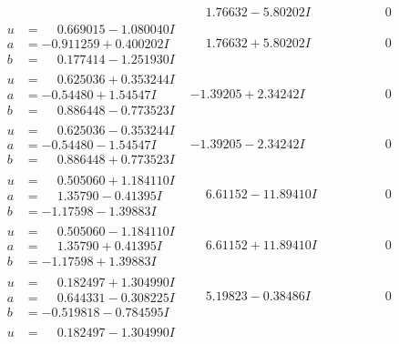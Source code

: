 \documentclass[1p]{elsarticle_modified}
\theoremstyle{definition}
\begin{document}
$$\begin{array}{c|c|c}
 & \phantom{-}1.76632 - 5.80202 I & \phantom{-0.000000 } 0 \\ \hline\begin{aligned}
u &= \phantom{-}0.669015 - 1.080040 I \\
a &= -0.911259 + 0.400202 I \\
b &= \phantom{-}0.177414 - 1.251930 I\end{aligned}
 & \phantom{-}1.76632 + 5.80202 I & \phantom{-0.000000 } 0 \\ \hline\begin{aligned}
u &= \phantom{-}0.625036 + 0.353244 I \\
a &= -0.54480 + 1.54547 I \\
b &= \phantom{-}0.886448 - 0.773523 I\end{aligned}
 & -1.39205 + 2.34242 I & \phantom{-0.000000 } 0 \\ \hline\begin{aligned}
u &= \phantom{-}0.625036 - 0.353244 I \\
a &= -0.54480 - 1.54547 I \\
b &= \phantom{-}0.886448 + 0.773523 I\end{aligned}
 & -1.39205 - 2.34242 I & \phantom{-0.000000 } 0 \\ \hline\begin{aligned}
u &= \phantom{-}0.505060 + 1.184110 I \\
a &= \phantom{-}1.35790 - 0.41395 I \\
b &= -1.17598 - 1.39883 I\end{aligned}
 & \phantom{-}6.61152 - 11.89410 I & \phantom{-0.000000 } 0 \\ \hline\begin{aligned}
u &= \phantom{-}0.505060 - 1.184110 I \\
a &= \phantom{-}1.35790 + 0.41395 I \\
b &= -1.17598 + 1.39883 I\end{aligned}
 & \phantom{-}6.61152 + 11.89410 I & \phantom{-0.000000 } 0 \\ \hline\begin{aligned}
u &= \phantom{-}0.182497 + 1.304990 I \\
a &= \phantom{-}0.644331 - 0.308225 I \\
b &= -0.519818 - 0.784595 I\end{aligned}
 & \phantom{-}5.19823 - 0.38486 I & \phantom{-0.000000 } 0 \\ \hline\begin{aligned}
u &= \phantom{-}0.182497 - 1.304990 I \\

\end{aligned}
\end{array}$$
\end{document}

